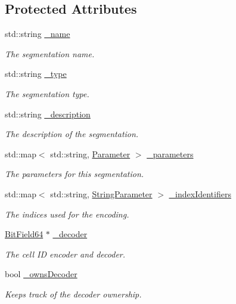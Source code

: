 \subsection*{Protected Attributes}
\begin{DoxyCompactItemize}
\item 
std\+::string \hyperlink{class_d_d4hep_1_1_d_d_segmentation_1_1_segmentation_aa129e659e465d9a0a60c7160d29de483}{\+\_\+name}
\begin{DoxyCompactList}\small\item\em The segmentation name. \end{DoxyCompactList}\item 
std\+::string \hyperlink{class_d_d4hep_1_1_d_d_segmentation_1_1_segmentation_a3dab8fc421e90851cc45b20b90754271}{\+\_\+type}
\begin{DoxyCompactList}\small\item\em The segmentation type. \end{DoxyCompactList}\item 
std\+::string \hyperlink{class_d_d4hep_1_1_d_d_segmentation_1_1_segmentation_a1e9aa1272b32dc4999584154baa72a14}{\+\_\+description}
\begin{DoxyCompactList}\small\item\em The description of the segmentation. \end{DoxyCompactList}\item 
std\+::map$<$ std\+::string, \hyperlink{namespace_d_d4hep_1_1_d_d_segmentation_af6c6bad2a745d807a0ed00506fb34ccf}{Parameter} $>$ \hyperlink{class_d_d4hep_1_1_d_d_segmentation_1_1_segmentation_a7ede8a80772ee04c5997696734f0c200}{\+\_\+parameters}
\begin{DoxyCompactList}\small\item\em The parameters for this segmentation. \end{DoxyCompactList}\item 
std\+::map$<$ std\+::string, \hyperlink{namespace_d_d4hep_1_1_d_d_segmentation_a43a80cf70a60b3c858aca4fa463d8f7c}{String\+Parameter} $>$ \hyperlink{class_d_d4hep_1_1_d_d_segmentation_1_1_segmentation_a55ce2740cffa420bb5ac2b7646e55d98}{\+\_\+index\+Identifiers}
\begin{DoxyCompactList}\small\item\em The indices used for the encoding. \end{DoxyCompactList}\item 
\hyperlink{class_d_d4hep_1_1_d_d_segmentation_1_1_bit_field64}{Bit\+Field64} $\ast$ \hyperlink{class_d_d4hep_1_1_d_d_segmentation_1_1_segmentation_a48d782572ff008ea0f05c869526735f4}{\+\_\+decoder}
\begin{DoxyCompactList}\small\item\em The cell ID encoder and decoder. \end{DoxyCompactList}\item 
bool \hyperlink{class_d_d4hep_1_1_d_d_segmentation_1_1_segmentation_a0e9e3e6639a67335971b827cf045cd4f}{\+\_\+owns\+Decoder}
\begin{DoxyCompactList}\small\item\em Keeps track of the decoder ownership. \end{DoxyCompactList}\end{DoxyCompactItemize}
